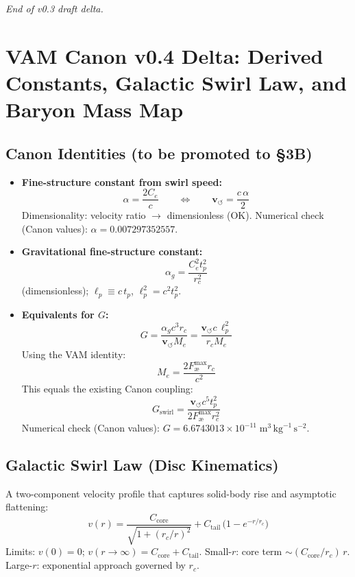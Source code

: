 \documentclass[11pt]{article}
\begin{document}
    \textit{End of v0.3 draft delta.}









    \section{VAM Canon v0.4 Delta: Derived Constants, Galactic Swirl Law, and Baryon Mass Map}
    \label{sec:vam-canon-v0.4-delta}

    \subsection{Canon Identities (to be promoted to \S3B)}
    \begin{itemize}
        \item \textbf{Fine-structure constant from swirl speed:}
        \[
            \boxed{\alpha = \frac{2 C_e}{c}} \qquad \Longleftrightarrow \qquad \boxed{\mathbf{v}_{\scriptscriptstyle\boldsymbol{\circlearrowleft}} = \frac{c\,\alpha}{2}}
        \]
        Dimensionality: velocity ratio $\rightarrow$ dimensionless (OK). Numerical check (Canon values): $\alpha=0.007297352557$.

        \item \textbf{Gravitational fine-structure constant:}
        \[
            \boxed{\alpha_g = \frac{C_e^{2} t_p^{2}}{r_c^{2}}}
        \]
        (dimensionless); $\ell_p \equiv c\,t_p$, $\ell_p^{2}=c^{2}t_p^{2}$.

        \item \textbf{Equivalents for $G$:}
        \[
            \boxed{G = \frac{\alpha_g c^{3} r_c}{\mathbf{v}_{\scriptscriptstyle\boldsymbol{\circlearrowleft}} M_e} = \frac{\mathbf{v}_{\scriptscriptstyle\boldsymbol{\circlearrowleft}} c\, \ell_p^{2}}{r_c M_e}}
        \]
        Using the VAM identity:
        \[
            \boxed{M_e = \frac{2 F_{\text{\ae}}^{\max} r_c}{c^{2}}}
        \]
        This equals the existing Canon coupling:
        \[
            \boxed{G_{\text{swirl}}=\frac{\mathbf{v}_{\scriptscriptstyle\boldsymbol{\circlearrowleft}} c^{5} t_p^{2}}{2 F_{\text{\ae}}^{\max} r_c^{2}}}
        \]
        Numerical check (Canon values): $G=6.6743013\times10^{-11}\;\text{m}^3\,\text{kg}^{-1}\,\text{s}^{-2}$.
    \end{itemize}

    \subsection{Galactic Swirl Law (Disc Kinematics)}
    A two-component velocity profile that captures solid-body rise and asymptotic flattening:
    \[
        \boxed{v(r) = \frac{C_{\text{core}}}{\sqrt{1 + (r_c/r)^2}} + C_{\text{tail}}\,\big(1 - e^{-r/r_c}\big)}
    \]
    Limits: $v(0)=0$; $v(r\to\infty)=C_{\text{core}}+C_{\text{tail}}$. Small-$r$: core term $\sim (C_{\text{core}}/r_c)\,r$. Large-$r$: exponential approach governed by $r_c$.
\end{document}

